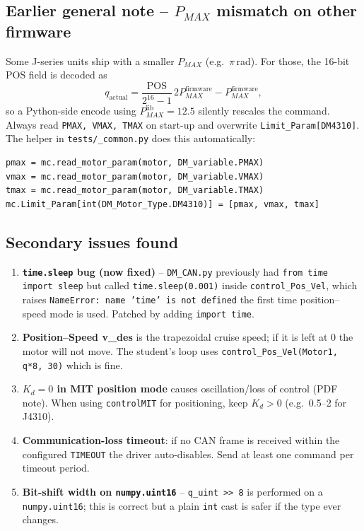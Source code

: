 \documentclass[11pt,a4paper]{article}
\begin{document}
\subsection{Earlier general note -- $P_{MAX}$ mismatch on other firmware}
Some J-series units ship with a smaller $P_{MAX}$ (e.g.\ $\pi$\,rad). For
those, the 16-bit POS field is decoded as
\[
q_{\text{actual}} = \frac{\text{POS}}{2^{16}-1}\,2P_{MAX}^{\text{firmware}} - P_{MAX}^{\text{firmware}},
\]
so a Python-side encode using $P_{MAX}^{\text{lib}}=12.5$ silently rescales
the command. Always read \texttt{PMAX, VMAX, TMAX} on start-up and overwrite
\texttt{Limit\_Param[DM4310]}. The helper in \texttt{tests/\_common.py} does
this automatically:
\begin{lstlisting}
pmax = mc.read_motor_param(motor, DM_variable.PMAX)
vmax = mc.read_motor_param(motor, DM_variable.VMAX)
tmax = mc.read_motor_param(motor, DM_variable.TMAX)
mc.Limit_Param[int(DM_Motor_Type.DM4310)] = [pmax, vmax, tmax]
\end{lstlisting}

\subsection{Secondary issues found}
\begin{enumerate}
  \item \textbf{\texttt{time.sleep} bug (now fixed)} -- \texttt{DM\_CAN.py}
        previously had \texttt{from time import sleep} but called
        \texttt{time.sleep(0.001)} inside \texttt{control\_Pos\_Vel}, which
        raises \texttt{NameError: name 'time' is not defined} the first time
        position--speed mode is used. Patched by adding \texttt{import time}.
  \item \textbf{Position--Speed v\_des} is the trapezoidal cruise speed; if it
        is left at 0 the motor will not move. The student's loop uses
        \texttt{control\_Pos\_Vel(Motor1, q*8, 30)} which is fine.
  \item \textbf{$K_d = 0$ in MIT position mode} causes oscillation/loss of
        control (PDF note). When using \texttt{controlMIT} for positioning,
        keep $K_d>0$ (e.g.\ 0.5--2 for J4310).
  \item \textbf{Communication-loss timeout}: if no CAN frame is received within
        the configured \texttt{TIMEOUT} the driver auto-disables. Send at least
        one command per timeout period.
  \item \textbf{Bit-shift width on \texttt{numpy.uint16}} -- \texttt{q\_uint
        >> 8} is performed on a \texttt{numpy.uint16}; this is correct but a
        plain \texttt{int} cast is safer if the type ever changes.
\end{enumerate}
\end{document}
